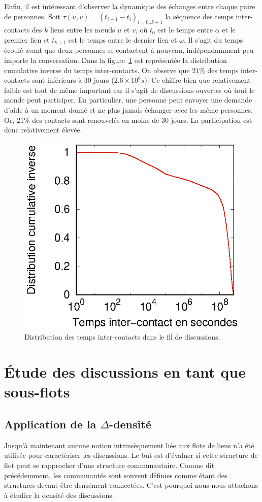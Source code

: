 Enfin, il est intéressant d'observer la dynamique des échanges entre chaque paire de personnes.
Soit $\tau(u,v) = (t_{i+1}-t_i)_{i=0..k+1}$ la séquence des temps inter-contacts des $k$ liens entre les n\oe{}uds $u$ et $v$, où $t_0$ est le temps entre $\alpha$ et le premier lien et $t_{k+1}$ est le temps entre le dernier lien et $\omega$.
Il s'agit du temps écoulé avant que deux personnes se contactent à nouveau, indépendamment peu importe la conversation.
Dans la figure~\ref{fig:ict_discussion} est représentée la distribution cumulative inverse du temps inter-contacts. 
On observe que $21\%$ des temps inter-contacts sont inférieurs à 30 jours ($2.6\times 10^6 s$).
Ce chiffre bien que relativement faible est tout de même important car il s'agit de discussions ouvertes où tout le monde peut participer. 
En particulier, une personne peut envoyer une demande d'aide à un moment donné et ne plus jamais échanger avec les même personnes.
Or, $21\%$ des contacts sont renouvelés en moins de 30 jours.
La participation est donc relativement élevée.
\begin{figure}
	\centering
	\includegraphics[width=0.4\linewidth]{img/mailing/ict-ccdf.eps}
	\caption{Distribution des temps inter-contacts dans le fil de discussions.}
	\label{fig:ict_discussion}
\end{figure}

\section{\'Etude des discussions en tant que sous-flots}
\label{etude_discussion}
\subsection{Application de la \texorpdfstring{$\Delta$}{delta}-densité}
\label{delta_densite}

Jusqu'à maintenant aucune notion intrinsèquement liée aux flots de liens n'a été utilisée pour caractériser les discussions.
Le but est d'évaluer si cette structure de flot peut se rapprocher d'une structure communautaire.
Comme dit précédemment, les communautés sont souvent définies comme étant des structures devant être densément connectées.
C'est pourquoi nous nous attachons à étudier la densité des discussions.

